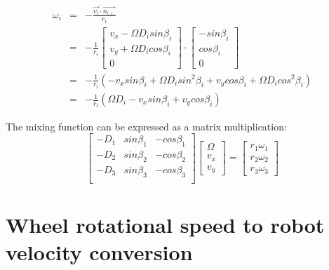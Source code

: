 \documentclass[a4paper]{paper}
\begin{document}
\begin{equation}
    \begin{array}{lcl}
        \omega_i &=& - \frac{\overrightarrow{v_i}
            \cdot \overrightarrow{n_{i\perp}}}{r_1} \\
        &=& - \frac{1}{r_i}
            \begin{bmatrix}
                v_x - \Omega D_i sin \beta_i \\
                v_y + \Omega D_i cos \beta_i \\
                0
            \end{bmatrix}
            \cdot
            \begin{bmatrix} -sin \beta_i \\ cos \beta_i \\ 0 \end{bmatrix} \\
        &=& - \frac{1}{r_i} (- v_x sin \beta_i + \Omega D_i sin^2\beta_i
            + v_y cos \beta_i + \Omega D_i cos^2 \beta_i) \\
        &=& - \frac{1}{r_i} (\Omega D_i - v_x sin \beta_i + v_y cos \beta_i)
    \end{array}
\end{equation}


The mixing function can be expressed as a matrix multiplication:
\begin{equation}
    \begin{bmatrix}
        - D_1 & sin \beta_1 & - cos \beta_1 \\
        - D_2 & sin \beta_2 & - cos \beta_2 \\
        - D_3 & sin \beta_3 & - cos \beta_3 \\
    \end{bmatrix}
    \begin{bmatrix}
        \Omega \\ v_x \\ v_y
    \end{bmatrix}
    = \begin{bmatrix} r_1 \omega_1 \\ r_2 \omega_2 \\ r_3 \omega_3 \end{bmatrix}
\end{equation}

\section{Wheel rotational speed to robot velocity conversion}
\end{document}
